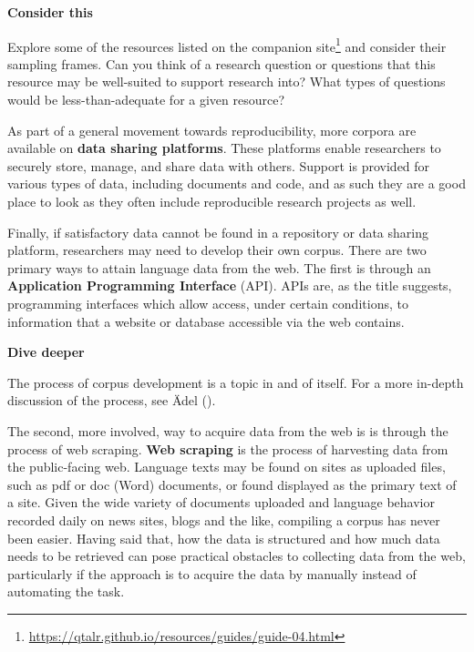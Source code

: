 \documentclass[
  letterpaper,
]{latex/krantz}
\theoremstyle{definition}
\theoremstyle{remark}
\DeclareRobustCommand{\href}[2]{#2\footnote{\url{#1}}}
\begin{document}
\begin{tcolorbox}[enhanced jigsaw, breakable, leftrule=.75mm, arc=.35mm, colframe=quarto-callout-color-frame, colback=white, left=2mm, bottomrule=.15mm, rightrule=.15mm, toprule=.15mm, opacityback=0]

\textbf{ Consider this}

Explore some of the resources listed on the
\href{https://qtalr.github.io/resources/guides/guide-04.html}{companion
site} and consider their sampling frames. Can you think of a research
question or questions that this resource may be well-suited to support
research into? What types of questions would be less-than-adequate for a
given resource?

\end{tcolorbox}

As part of a general movement towards reproducibility, more corpora are
available on \textbf{data sharing
platforms}. These platforms enable researchers to securely store,
manage, and share data with others. Support is provided for various
types of data, including documents and code, and as such they are a good
place to look as they often include reproducible research projects as
well.

Finally, if satisfactory data cannot be found in a repository or data
sharing platform, researchers may need to develop their own corpus.
There are two primary ways to attain language data from the web. The
first is through an \textbf{Application Programming Interface} (API).
APIs are, as the title suggests, programming interfaces which allow
access, under certain conditions, to information that a website or
database accessible via the web contains.

\begin{tcolorbox}[enhanced jigsaw, breakable, leftrule=.75mm, arc=.35mm, colframe=quarto-callout-color-frame, colback=white, left=2mm, bottomrule=.15mm, rightrule=.15mm, toprule=.15mm, opacityback=0]

\textbf{ Dive deeper}

The process of corpus development is a topic in and of itself. For a
more in-depth discussion of the process, see Ädel
().

\end{tcolorbox}

The second, more involved, way to acquire data from the web is is
through the process of web scraping. \textbf{Web scraping} is the
process of harvesting data from the public-facing web. Language texts
may be found on sites as uploaded files, such as pdf or doc (Word)
documents, or found displayed as the primary text of a site. Given the
wide variety of documents uploaded and language behavior recorded daily
on news sites, blogs and the like, compiling a corpus has never been
easier. Having said that, how the data is structured and how much data
needs to be retrieved can pose practical obstacles to collecting data
from the web, particularly if the approach is to acquire the data by
manually instead of automating the task.
\end{document}
